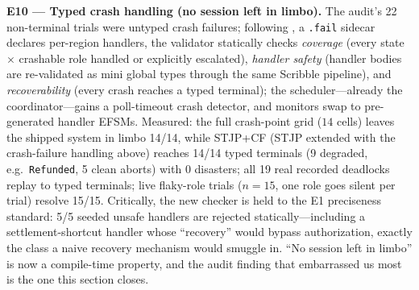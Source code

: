 \documentclass{article}
\newcommand{\stjp}{\textsc{STJP}}
\begin{document}
\textbf{E10 --- Typed crash handling (no session left in limbo).} The audit's 22 non-terminal trials were untyped crash failures; following \citet{viering18}, a \texttt{.fail} sidecar declares per-region handlers, the validator statically checks \emph{coverage} (every state $\times$ crashable role handled or explicitly escalated), \emph{handler safety} (handler bodies are re-validated as mini global types through the same Scribble pipeline), and \emph{recoverability} (every crash reaches a typed terminal); the scheduler---already the coordinator---gains a poll-timeout crash detector, and monitors swap to pre-generated handler EFSMs. Measured: the full crash-point grid ($14$ cells) leaves the shipped system in limbo 14/14, while \stjp{}+CF (\stjp{} extended with the crash-failure handling above) reaches 14/14 typed terminals (9 degraded, e.g.\ \texttt{Refunded}, 5 clean aborts) with 0 disasters; all 19 real recorded deadlocks replay to typed terminals; live flaky-role trials ($n{=}15$, one role goes silent per trial) resolve 15/15. Critically, the new checker is held to the E1 preciseness standard: 5/5 seeded unsafe handlers are rejected statically---including a settlement-shortcut handler whose ``recovery'' would bypass authorization, exactly the class a naive recovery mechanism would smuggle in. ``No session left in limbo'' is now a compile-time property, and the audit finding that embarrassed us most is the one this section closes.
\end{document}
